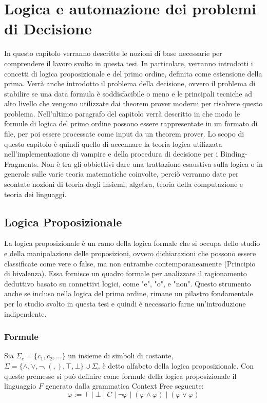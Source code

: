 \documentclass[./main.tex]{subfiles}
\begin{document}
\chapter{Logica e automazione dei problemi di Decisione}

In questo capitolo verranno descritte le nozioni di base necessarie 
per comprendere il lavoro svolto in questa tesi. 
In particolare, verranno introdotti i concetti di logica proposizionale e 
del primo ordine, definita come estensione della prima.
Verrà anche introdotto il problema della decisione, ovvero il problema di stabilire se una data formula è soddisfacibile o meno
e le principali tecniche ad alto livello che vengono utilizzate dai theorem prover moderni per risolvere questo problema.
Nell'ultimo paragrafo del capitolo 
verrà descritto in che modo le formule di logica del 
primo ordine possono essere rappresentate in un formato di file, per poi essere 
processate come input da un theorem prover. 
Lo scopo di questo capitolo è quindi quello di accennare la teoria logica utilizzata nell'implementazione di vampire 
e della procedura di decisione per i Binding-Fragments.
Non è tra gli obbiettivi dare una trattazione esaustiva sulla logica o in generale sulle varie teoria matematiche coinvolte, 
perciò verranno date per scontate nozioni di teoria degli insiemi,
algebra, teoria della computazione e teoria dei linguaggi.



\section{Logica Proposizionale}

La logica proposizionale è un ramo della logica formale che si occupa dello studio e della manipolazione delle proposizioni, 
ovvero dichiarazioni che possono essere classificate come vere o false, ma non entrambe contemporaneamente (Principio di bivalenza).
Essa fornisce un quadro formale per analizzare il ragionamento deduttivo basato su connettivi logici, come "e", "o", e "non".
Questo strumento anche se incluso nella logica del primo ordine,
rimane un pilastro fondamentale per lo studio svolto in questa tesi e quindi è necessario farne un'introduzione indipendente.

\subsection{Formule}
Sia $\Sigma_c = \{c_1, c_2, ...\}$ un insieme di simboli di costante, 
$\Sigma = \{ \land, \lor, \lnot, (, ), \top, \bot\} \cup \Sigma_c$ è detto alfabeto della logica proposizionale. 
Con queste premesse si può definire come formule della logica proposizionale il linguaggio $F$ generato dalla
grammatica Context Free seguente:
$$
\varphi  := \top \mid \bot \mid C \mid \lnot \varphi \mid (\varphi \land \varphi) \mid (\varphi \lor \varphi)
$$
\end{document}

